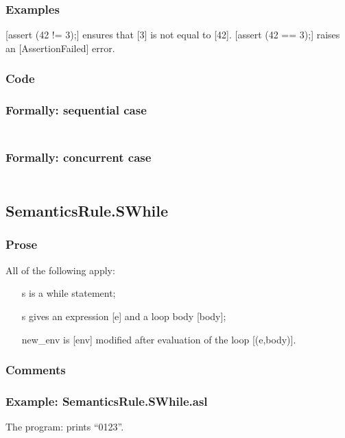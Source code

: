 \documentclass{book}
\begin{document}
    \subsubsection{Examples}
    [assert (42 != 3);] ensures that [3] is not equal to [42].
    [assert (42 == 3);] raises an [AssertionFailed] error.

  \subsubsection{Code}

  \subsubsection{Formally: sequential case}
  \begin{align}
  \end{align} 

  \subsubsection{Formally: concurrent case}
  \begin{align}
  \end{align} 

\subsection{SemanticsRule.SWhile \label{sec:SemanticsRule.SWhile}}

    \subsubsection{Prose}
    All of the following apply:
    \begin{itemize}
    \item [s] is a while statement;
    \item [s] gives an expression [e] and a loop body [body];
    \item [new\_env] is [env] modified after evaluation of the loop [(e,body)].
    \end{itemize}

    \subsubsection{Comments}

    \subsubsection{Example: SemanticsRule.SWhile.asl}
    The program:
    prints ``0123''.
\end{document}
